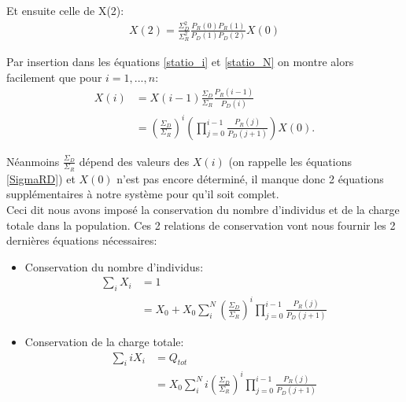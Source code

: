 Et ensuite celle de X(2):
\begin{equation}
\begin{aligned}
X(2) = \frac{\Sigma^2_D}{\Sigma^2_R} \frac{P_R(0)P_R(1)}{P_D(1)P_D(2)} X(0)
\end{aligned}
\end{equation}

Par insertion dans les équations \ref{statio_i} et \ref{statio_N} on montre alors facilement que pour $i = 1,...,n$:
\begin{equation}
\begin{aligned}
X(i)&= X(i-1) \frac{\Sigma_D}{\Sigma_R} \frac{P_R(i-1)}{P_D(i)}  \\ 
	&= (\frac{\Sigma_D}{\Sigma_R})^i (\prod_{j=0}^{i-1} \frac{P_R(j)}{P_D(j+1)}) X(0).
\label{expression_Xi}
\end{aligned}
\end{equation}

Néanmoins $\frac{\Sigma_D}{\Sigma_R}$ dépend des valeurs des $X(i)$ (on rappelle les équations \ref{SigmaRD}) et $X(0)$ n'est pas encore déterminé, il manque donc 2 équations supplémentaires à notre système pour qu'il soit complet.\\

Ceci dit nous avons imposé la conservation du nombre d'individus et de la charge totale dans la population. Ces 2 relations de conservation vont nous fournir les 2 dernières équations nécessaires:
\begin{itemize}
	\item Conservation du nombre d'individus:
		\begin{equation}
		\begin{aligned}
		\sum_i X_i 	&= 1\\
					&= X_0+X_0 \sum_i^{N} (\frac{\Sigma_D}{\Sigma_R})^i \prod_{j=0}^{i-1}\frac{P_R(j)}{P_D(j+1)}
		\end{aligned}
		\end{equation}
		
	\item Conservation de la charge totale:
		\begin{equation}
		\begin{aligned}
		\sum_i i X_i 	&= Q_{tot}\\
					&= X_0 \sum_i^{N} i (\frac{\Sigma_D}{\Sigma_R})^i \prod_{j=0}^{i-1}\frac{P_R(j)}{P_D(j+1)}
		\end{aligned}
		\end{equation}
\end{itemize}

